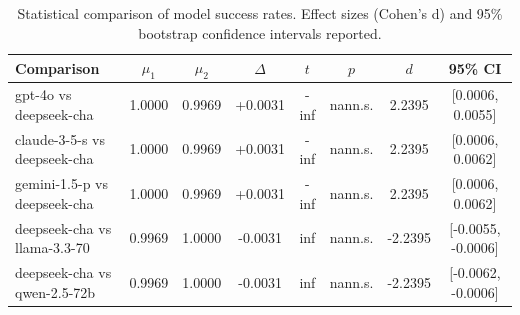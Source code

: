 \begin{table}[t]
\centering
\caption{Statistical comparison of model success rates. Effect sizes (Cohen's d) and 95\% bootstrap confidence intervals reported.}
\label{tab:statistical}
\begin{tabular}{lccccccc}
\toprule
Comparison & $\mu_1$ & $\mu_2$ & $\Delta$ & $t$ & $p$ & $d$ & 95\% CI \\
\midrule
gpt-4o vs deepseek-cha & 1.0000 & 0.9969 & +0.0031 & -inf & nann.s. & 2.2395 & [0.0006, 0.0055] \\
claude-3-5-s vs deepseek-cha & 1.0000 & 0.9969 & +0.0031 & -inf & nann.s. & 2.2395 & [0.0006, 0.0062] \\
gemini-1.5-p vs deepseek-cha & 1.0000 & 0.9969 & +0.0031 & -inf & nann.s. & 2.2395 & [0.0006, 0.0062] \\
deepseek-cha vs llama-3.3-70 & 0.9969 & 1.0000 & -0.0031 & inf & nann.s. & -2.2395 & [-0.0055, -0.0006] \\
deepseek-cha vs qwen-2.5-72b & 0.9969 & 1.0000 & -0.0031 & inf & nann.s. & -2.2395 & [-0.0062, -0.0006] \\
\bottomrule
\end{tabular}
\end{table}
